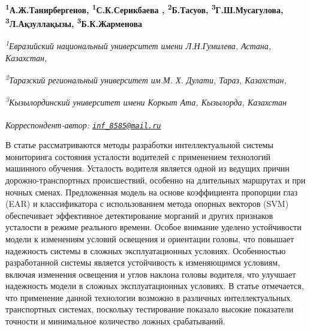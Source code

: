 
\begin{articleheader}

{\bfseries \textsuperscript{1}А.Ж.Танирбергенов\authorid,
\textsuperscript{1}С.К.Серикбаева\textsuperscript{\envelope } \authorid,
\textsuperscript{2}Б.Тасуов\authorid,
\textsuperscript{3}Г.Ш.Мусагулова\authorid,
\textsuperscript{3}Л.Ақзуллақызы\authorid,
\textsuperscript{3}Б.К.Жарменова\authorid}
\end{articleheader}

\begin{affiliation}
\emph{\textsuperscript{1}Евразийский национальный университет имени Л.Н.Гумилева, Астана, Казахстан,}

\emph{\textsuperscript{2}Таразский региональный университет им.М. Х. Дулати, Тараз, Казахстан,}

\emph{\textsuperscript{3}Кызылординский университет имени Коркыт Ата, Кызылорда, Казахстан}

\raggedright \textsuperscript{\envelope }\emph{Корреспондент-автор: \href{mailto:inf_8585@mail.ru}{\nolinkurl{inf\_8585@mail.ru}}}
\end{affiliation}

В статье рассматриваются методы разработки интеллектуальной системы
мониторинга состояния усталости водителей с применением технологий
машинного обучения. Усталость водителя является одной из ведущих причин
дорожно-транспортных происшествий, особенно на длительных маршрутах и
при ночных сменах. Предложенная модель на основе коэффициента пропорции
глаз (EAR) и классификатора с использованием метода опорных векторов
(SVM) обеспечивает эффективное детектирование морганий и других
признаков усталости в режиме реального времени. Особое внимание уделено
устойчивости модели к изменениям условий освещения и ориентации головы,
что повышает надежность системы в сложных эксплуатационных условиях.
Особенностью разработанной системы является устойчивость к изменяющимся
условиям, включая изменения освещения и углов наклона головы водителя,
что улучшает надежность модели в сложных эксплуатационных условиях. В
статье отмечается, что применение данной технологии возможно в различных
интеллектуальных транспортных системах, поскольку тестирование показало
высокие показатели точности и минимальное количество ложных
срабатываний.

